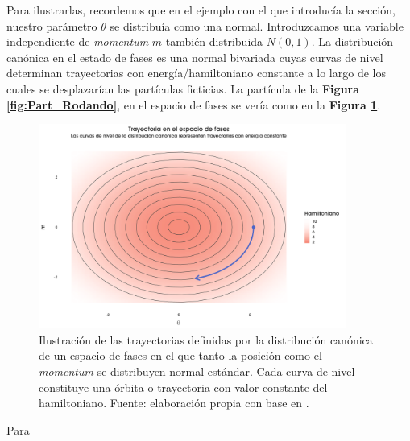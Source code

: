  Para ilustrarlas, recordemos que en el ejemplo con el que introducía la sección, nuestro parámetro $\theta$ se distribuía como una normal. Introduzcamos una variable independiente de \textit{momentum} $m$ también distribuida $N(0,1)$. La distribución canónica en el estado de fases es una normal bivariada cuyas curvas de nivel determinan trayectorias con energía/hamiltoniano constante a lo largo de los cuales se desplazarían las partículas ficticias. La partícula de la \textbf{Figura \ref{fig:Part_Rodando}}, en el espacio de fases se vería como en la \textbf{Figura \ref{fig:Trayectoria_Espacio_Fase}}.
 
 \begin{figure}[h]
	\centering
	\includegraphics[width=0.9\textwidth]{Figs/Bayes/Trayectoria_Espacio_Fase}
	\caption{Ilustración de las trayectorias definidas por la distribución canónica de un espacio de fases en el que tanto la posición como el \textit{momentum} se distribuyen normal estándar. Cada curva de nivel constituye una órbita o trayectoria con valor constante del hamiltoniano. Fuente: elaboración propia con base en \textcite{Betancourt17}.}
	\label{fig:Trayectoria_Espacio_Fase}	
\end{figure}
 
 Para